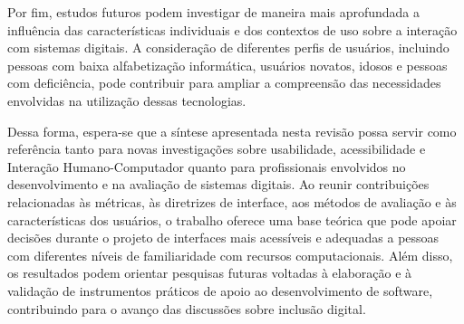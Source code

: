Por fim, estudos futuros podem investigar de maneira mais aprofundada a influência das características individuais e dos contextos de uso sobre a interação com sistemas digitais. A consideração de diferentes perfis de usuários, incluindo pessoas com baixa alfabetização informática, usuários novatos, idosos e pessoas com deficiência, pode contribuir para ampliar a compreensão das necessidades envolvidas na utilização dessas tecnologias.

Dessa forma, espera-se que a síntese apresentada nesta revisão possa servir como referência tanto para novas investigações sobre usabilidade, acessibilidade e Interação Humano-Computador quanto para profissionais envolvidos no desenvolvimento e na avaliação de sistemas digitais. Ao reunir contribuições relacionadas às métricas, às diretrizes de interface, aos métodos de avaliação e às características dos usuários, o trabalho oferece uma base teórica que pode apoiar decisões durante o projeto de interfaces mais acessíveis e adequadas a pessoas com diferentes níveis de familiaridade com recursos computacionais. Além disso, os resultados podem orientar pesquisas futuras voltadas à elaboração e à validação de instrumentos práticos de apoio ao desenvolvimento de software, contribuindo para o avanço das discussões sobre inclusão digital.